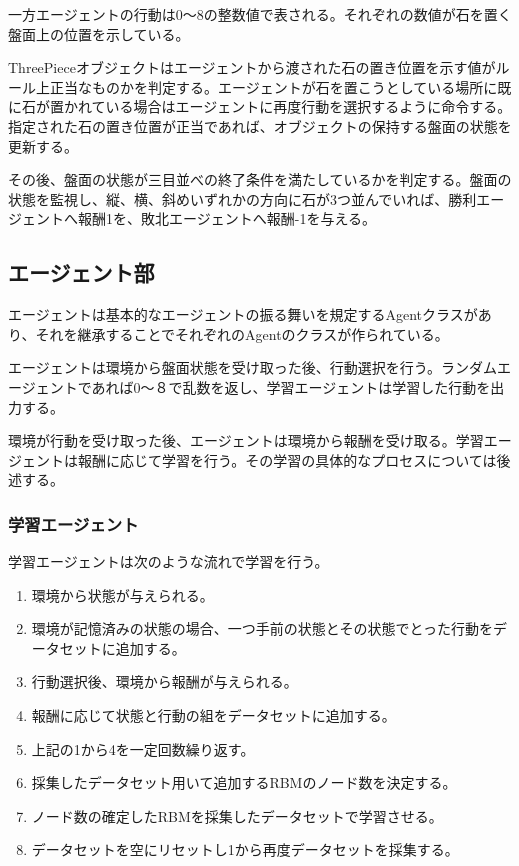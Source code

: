 一方エージェントの行動は0〜8の整数値で表される。それぞれの数値が石を置く盤面上の位置を示している。


ThreePieceオブジェクトはエージェントから渡された石の置き位置を示す値がルール上正当なものかを判定する。エージェントが石を置こうとしている場所に既に石が置かれている場合はエージェントに再度行動を選択するように命令する。指定された石の置き位置が正当であれば、オブジェクトの保持する盤面の状態を更新する。

その後、盤面の状態が三目並べの終了条件を満たしているかを判定する。盤面の状態を監視し、縦、横、斜めいずれかの方向に石が3つ並んでいれば、勝利エージェントへ報酬1を、敗北エージェントへ報酬-1を与える。

\subsection{エージェント部}
エージェントは基本的なエージェントの振る舞いを規定するAgentクラスがあり、それを継承することでそれぞれのAgentのクラスが作られている。

エージェントは環境から盤面状態を受け取った後、行動選択を行う。ランダムエージェントであれば0〜８で乱数を返し、学習エージェントは学習した行動を出力する。

環境が行動を受け取った後、エージェントは環境から報酬を受け取る。学習エージェントは報酬に応じて学習を行う。その学習の具体的なプロセスについては後述する。

\subsubsection{学習エージェント}
学習エージェントは次のような流れで学習を行う。


\begin{enumerate}
  \item 環境から状態が与えられる。
  \item 環境が記憶済みの状態の場合、一つ手前の状態とその状態でとった行動をデータセットに追加する。
  \item 行動選択後、環境から報酬が与えられる。
  \item 報酬に応じて状態と行動の組をデータセットに追加する。
  \item 上記の1から4を一定回数繰り返す。
  \item 採集したデータセット用いて追加するRBMのノード数を決定する。
  \item ノード数の確定したRBMを採集したデータセットで学習させる。
  \item データセットを空にリセットし1から再度データセットを採集する。
\end{enumerate}




